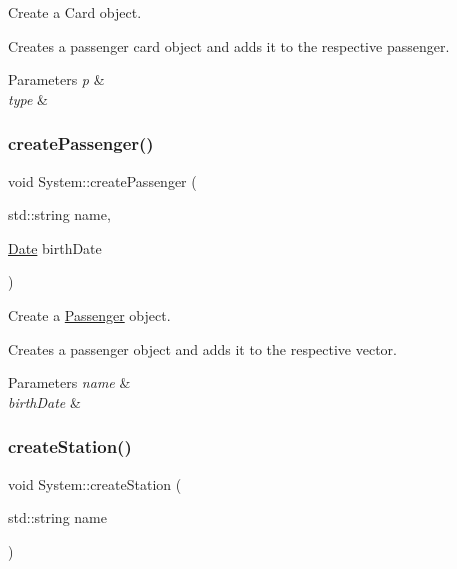 Create a Card object. 

Creates a passenger card object and adds it to the respective passenger.


\begin{DoxyParams}{Parameters}
{\em p} & \\
\hline
{\em type} & \\
\hline
\end{DoxyParams}
\mbox{\label{classSystem_a623d7369872a9af9b69b24bd2a3c71b1}} 
\subsubsection{\texorpdfstring{create\+Passenger()}{createPassenger()}}
{\footnotesize\ttfamily void System\+::create\+Passenger (\begin{DoxyParamCaption}\item[{std\+::string}]{name,  }\item[{\mbox{\hyperlink{classDate}{Date}}}]{birth\+Date }\end{DoxyParamCaption})}



Create a \mbox{\hyperlink{classPassenger}{Passenger}} object. 

Creates a passenger object and adds it to the respective vector.


\begin{DoxyParams}{Parameters}
{\em name} & \\
\hline
{\em birth\+Date} & \\
\hline
\end{DoxyParams}
\mbox{\label{classSystem_ab8cf1529f497af79b72fe6cc59b08d60}} 
\subsubsection{\texorpdfstring{create\+Station()}{createStation()}}
{\footnotesize\ttfamily void System\+::create\+Station (\begin{DoxyParamCaption}\item[{std\+::string}]{name }\end{DoxyParamCaption})}




